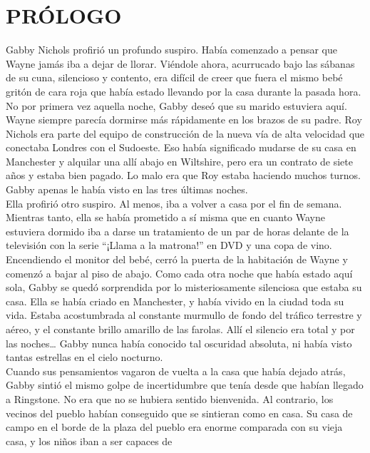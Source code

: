 \chapter*{PRÓLOGO}

{Gabby Nichols profirió un profundo suspiro. Había comenzado a pensar que
Wayne jamás iba a dejar de llorar. Viéndole ahora, acurrucado bajo las
sábanas de su cuna, silencioso y contento, era difícil de creer que
fuera el mismo bebé gritón de cara roja que había estado llevando por la
casa durante la pasada hora.\\
No por primera vez aquella noche, Gabby deseó que su marido estuviera
aquí. Wayne siempre parecía dormirse más rápidamente en los brazos de su
padre. Roy Nichols era parte del equipo de construcción de la nueva vía
de alta velocidad que conectaba Londres con el Sudoeste. Eso había
significado mudarse de su casa en Manchester y alquilar una allí abajo
en Wiltshire, pero era un contrato de siete años y estaba bien pagado.
Lo malo era que Roy estaba haciendo muchos turnos. Gabby apenas le había
visto en las tres últimas noches.\\
Ella profirió otro suspiro. Al menos, iba a volver a casa por el fin de
semana. Mientras tanto, ella se había prometido a sí misma que en cuanto
Wayne estuviera dormido iba a darse un tratamiento de un par de horas
delante de la televisión con la serie ``¡Llama a la matrona!'' en DVD y
una copa de vino.\\
Encendiendo el monitor del bebé, cerró la puerta de la habitación de
Wayne y comenzó a bajar al piso de abajo. Como cada otra noche que había
estado aquí sola, Gabby se quedó sorprendida por lo misteriosamente
silenciosa que estaba su casa. Ella se había criado en Manchester, y
había vivido en la ciudad toda su vida. Estaba acostumbrada al constante
murmullo de fondo del tráfico terrestre y aéreo, y el constante brillo
amarillo de las farolas. Allí el silencio era total y por las
noches\ldots{} Gabby nunca había conocido tal oscuridad absoluta, ni
había visto tantas estrellas en el cielo nocturno.\\
Cuando sus pensamientos vagaron de vuelta a la casa que había dejado
atrás, Gabby sintió el mismo golpe de incertidumbre que tenía desde que
habían llegado a Ringstone. No era que no se hubiera sentido bienvenida.
Al contrario, los vecinos del pueblo habían conseguido que se sintieran
como en casa. Su casa de campo en el borde de la plaza del pueblo era
enorme comparada con su vieja casa, y los niños iban a ser capaces de
}
